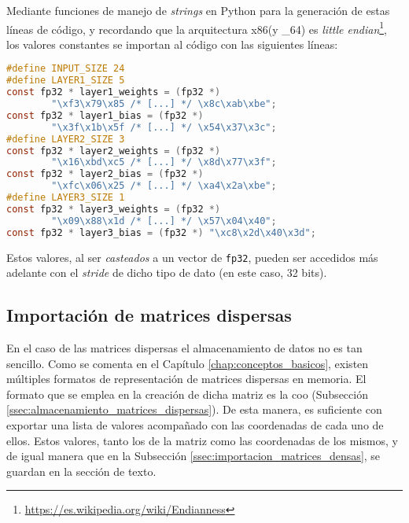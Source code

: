 Mediante funciones de manejo de \textit{strings} en Python para la generación de estas líneas de código, y recordando que la arquitectura x86(y \_64) es \textit{little endian}\footnote{\url{https://es.wikipedia.org/wiki/Endianness}}, los valores constantes se importan al código con las siguientes líneas:\medskip
\begin{lstlisting}[language=C]
#define INPUT_SIZE 24
#define LAYER1_SIZE 5
const fp32 * layer1_weights = (fp32 *)
        "\xf3\x79\x85 /* [...] */ \x8c\xab\xbe";
const fp32 * layer1_bias = (fp32 *)
        "\x3f\x1b\x5f /* [...] */ \x54\x37\x3c";
#define LAYER2_SIZE 3
const fp32 * layer2_weights = (fp32 *)
        "\x16\xbd\xc5 /* [...] */ \x8d\x77\x3f";
const fp32 * layer2_bias = (fp32 *)
        "\xfc\x06\x25 /* [...] */ \xa4\x2a\xbe";
#define LAYER3_SIZE 1
const fp32 * layer3_weights = (fp32 *)
        "\x09\x88\x1d /* [...] */ \x57\x04\x40";
const fp32 * layer3_bias = (fp32 *) "\xc8\x2d\x40\x3d";
\end{lstlisting}

Estos valores, al ser \textit{casteados} a un vector de \texttt{fp32}, pueden ser accedidos más adelante con el \textit{stride} de dicho tipo de dato (en este caso, 32 bits).

\subsection{Importación de matrices dispersas}
\label{ssec:importacion_matrices_dispersas}
En el caso de las matrices dispersas el almacenamiento de datos no es tan sencillo. Como se comenta en el Capítulo \ref{chap:conceptos_basicos}, existen múltiples formatos de representación de matrices dispersas en memoria. El formato que se emplea en la creación de dicha matriz es la \acrshort{coo} (Subsección \ref{ssec:almacenamiento_matrices_dispersas}). De esta manera, es suficiente con exportar una lista de valores acompañado con las coordenadas de cada uno de ellos. Estos valores, tanto los de la matriz como las coordenadas de los mismos, y de igual manera que en la Subsección \ref{ssec:importacion_matrices_densas}, se guardan en la sección de texto.

